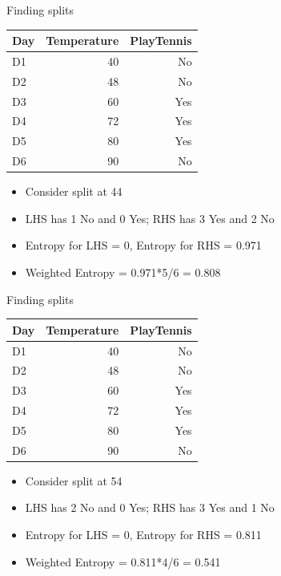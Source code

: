 \documentclass[usenames,dvipsnames]{beamer}
\begin{document}
\begin{frame}{Finding splits}
	\begin{table}[]
		\begin{tabular}{@{}lrr@{}}
			\toprule
			\textbf{Day} & \textbf{Temperature} & \textbf{PlayTennis} \\ \midrule
			D1           & 40                   & No                  \\
			D2           & 48                   & No                  \\
			D3           & 60                   & Yes                 \\
			D4           & 72                   & Yes                 \\
			D5           & 80                   & Yes                 \\
			D6           & 90                   & No                  \\ \bottomrule
		\end{tabular}
	\end{table}
	\begin{itemize}
		\item Consider split at 44
		\item LHS has 1 No and 0 Yes; RHS has 3 Yes and 2 No
		\item Entropy for LHS = 0, Entropy for RHS = 0.971
		\item Weighted Entropy = 0.971*5/6 = 0.808
	\end{itemize}
	\end{frame}

	\begin{frame}{Finding splits}
		\begin{table}[]
			\begin{tabular}{@{}lrr@{}}
				\toprule
				\textbf{Day} & \textbf{Temperature} & \textbf{PlayTennis} \\ \midrule
				D1           & 40                   & No                  \\
				D2           & 48                   & No                  \\
				D3           & 60                   & Yes                 \\
				D4           & 72                   & Yes                 \\
				D5           & 80                   & Yes                 \\
				D6           & 90                   & No                  \\ \bottomrule
			\end{tabular}
		\end{table}
		\begin{itemize}
			\item Consider split at 54
			\item LHS has 2 No and 0 Yes; RHS has 3 Yes and 1 No
			\item Entropy for LHS = 0, Entropy for RHS = 0.811
			\item Weighted Entropy = 0.811*4/6 = 0.541
		\end{itemize}
		\end{frame}
\end{document}
